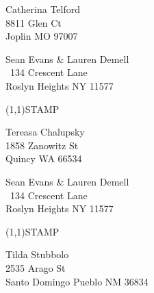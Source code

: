 \documentclass[12pt]{article}
\begin{document}
\begin{center} \begin{Huge} \vspace*{\fill}
Catherina Telford\\
8811 Glen Ct\\
Joplin MO 97007\\
\vspace{\fill} \end{Huge} \end{center}

\clearpage

\begin{minipage}{.5\linewidth} \noindent
Sean Evans \& Lauren Demell\\\ 
134 Crescent Lane\\ 
Roslyn Heights NY 11577
\end{minipage}
\begin{minipage}{.5\linewidth \hspace{-.2in} \vspace{-.3in}}
\begin{flushright}
\framebox(1,1){STAMP}
\end{flushright}
\end{minipage}

\begin{center} \begin{Huge} \vspace*{\fill}
Tereasa Chalupsky\\
1858 Zanowitz St\\
Quincy WA 66534\\
\vspace{\fill} \end{Huge} \end{center}

\clearpage

\begin{minipage}{.5\linewidth} \noindent
Sean Evans \& Lauren Demell\\\ 
134 Crescent Lane\\ 
Roslyn Heights NY 11577
\end{minipage}
\begin{minipage}{.5\linewidth \hspace{-.2in} \vspace{-.3in}}
\begin{flushright}
\framebox(1,1){STAMP}
\end{flushright}
\end{minipage}

\begin{center} \begin{Huge} \vspace*{\fill}
Tilda Stubbolo\\
2535 Arago St\\
Santo Domingo Pueblo NM 36834\\
\vspace{\fill} \end{Huge} \end{center}
\end{document}
